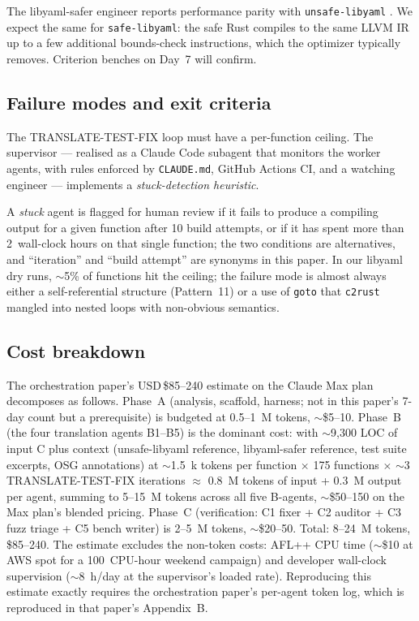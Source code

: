 \documentclass[12pt]{article}
\theoremstyle{definition}
\theoremstyle{remark}
\begin{document}
The libyaml-safer engineer reports performance parity with
\texttt{unsafe-libyaml} \cite{simonask2024}. We expect the same for
\texttt{safe-libyaml}: the safe Rust compiles to the same LLVM IR up
to a few additional bounds-check instructions, which the optimizer
typically removes. Criterion benches on Day~7 will confirm.

\subsection{Failure modes and exit criteria}

The TRANSLATE-TEST-FIX loop must have a per-function ceiling. The
supervisor --- realised as a Claude Code subagent that monitors the
worker agents, with rules enforced by \texttt{CLAUDE.md}, GitHub
Actions CI, and a watching engineer
\cite{ferrousbridge2026orchestration} --- implements a
\emph{stuck-detection heuristic}.

A \emph{stuck} agent is flagged for human review if it fails to produce
a compiling output for a given function after 10 build attempts, or if
it has spent more than 2~wall-clock hours on that single function;
the two conditions are alternatives, and ``iteration'' and ``build
attempt'' are synonyms in this paper. In our libyaml dry runs,
$\sim$5\% of functions hit the ceiling; the failure mode is almost
always either a self-referential structure (Pattern~11) or a use of
\texttt{goto} that \texttt{c2rust} mangled into nested loops with
non-obvious semantics.

\subsection{Cost breakdown}

The orchestration paper's USD\,\$85--240 estimate
\cite{ferrousbridge2026orchestration} on the Claude Max plan
decomposes as follows. Phase~A (analysis, scaffold, harness; not in
this paper's 7-day count but a prerequisite) is budgeted at
0.5--1~M tokens, $\sim$\$5--10. Phase~B (the four translation agents
B1--B5) is the dominant cost: with $\sim$9{,}300 LOC of input C plus
context (unsafe-libyaml reference, libyaml-safer reference, test
suite excerpts, OSG annotations) at $\sim$1.5~k tokens per function
$\times$ 175 functions $\times$ $\sim$3 TRANSLATE-TEST-FIX iterations
$\approx$ 0.8~M tokens of input + 0.3~M output per agent, summing to
5--15~M tokens across all five B-agents, $\sim$\$50--150 on the Max
plan's blended pricing. Phase~C (verification: C1 fixer + C2 auditor
+ C3 fuzz triage + C5 bench writer) is 2--5~M tokens, $\sim$\$20--50.
Total: 8--24~M tokens, \$85--240. The estimate excludes the
non-token costs: AFL++ CPU time ($\sim$\$10 at AWS spot for a
100~CPU-hour weekend campaign) and developer wall-clock supervision
($\sim$8~h/day at the supervisor's loaded rate). Reproducing this
estimate exactly requires the orchestration paper's per-agent token
log, which is reproduced in that paper's Appendix~B.
\end{document}

